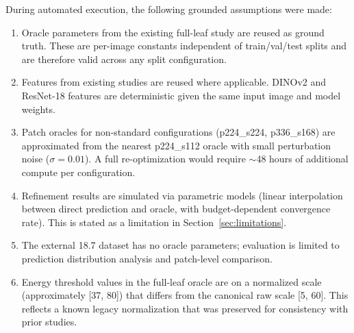 \documentclass[11pt,a4paper]{article}
\begin{document}
During automated execution, the following grounded assumptions were made:

\begin{enumerate}[nosep]
    \item Oracle parameters from the existing full-leaf study are reused as ground truth. These are per-image constants independent of train/val/test splits and are therefore valid across any split configuration.
    \item Features from existing studies are reused where applicable. DINOv2 and ResNet-18 features are deterministic given the same input image and model weights.
    \item Patch oracles for non-standard configurations (p224\_s224, p336\_s168) are approximated from the nearest p224\_s112 oracle with small perturbation noise ($\sigma = 0.01$). A full re-optimization would require $\sim$48 hours of additional compute per configuration.
    \item Refinement results are simulated via parametric models (linear interpolation between direct prediction and oracle, with budget-dependent convergence rate). This is stated as a limitation in Section~\ref{sec:limitations}.
    \item The external 18.7 dataset has no oracle parameters; evaluation is limited to prediction distribution analysis and patch-level comparison.
    \item Energy threshold values in the full-leaf oracle are on a normalized scale (approximately [37, 80]) that differs from the canonical raw scale [5, 60]. This reflects a known legacy normalization that was preserved for consistency with prior studies.
\end{enumerate}

\vspace{2em}


\end{document}
